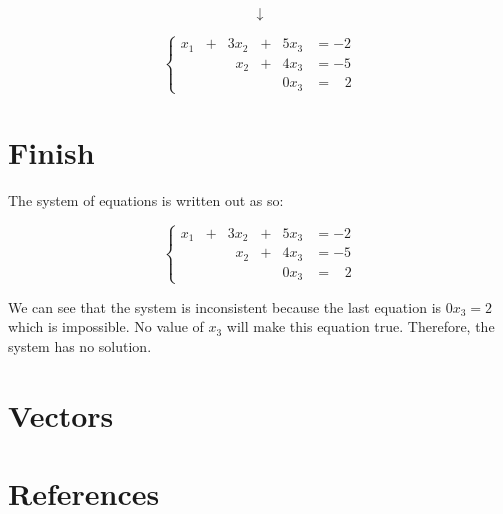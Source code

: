 \documentclass[
  letterpaper,
  DIV=11,
  numbers=noendperiod]{scrreprt}
\newlength{\cslhangindent}
\newlength{\cslentryspacingunit} %
\newenvironment{CSLReferences}[2] %
 {%
  \setlength{\parindent}{0pt}
  \ifodd #1
  \let\oldpar\par
  \def\par{\hangindent=\cslhangindent\oldpar}
  \fi
  \setlength{\parskip}{#2\cslentryspacingunit}
 }%
 {}
\begin{document}
\[  
\downarrow
\]

\[
\begin{cases}
x_1 &+ &3x_2 &+ &5x_3 &= -2 \\
& &\;\;x_2 &+ &4x_3 &= -5 \\
& & & &0x_3 &= \;\;\;2
\end{cases}
\]

\chapter{Finish}

The system of equations is written out as so:

\[
\begin{cases}
x_1 &+ &3x_2 &+ &5x_3 &= -2 \\
& &\;\;x_2 &+ &4x_3 &= -5 \\
& & & &0x_3 &= \;\;\;2
\end{cases}
\]

We can see that the system is inconsistent because the last equation is
\(0x_3 = 2\) which is impossible. No value of \(x_3\) will make this
equation true. Therefore, the system has no solution.


\hypertarget{vectors}{%
\chapter{Vectors}\label{vectors}}


\hypertarget{references}{%
\chapter*{References}\label{references}}


\hypertarget{refs}{}
\begin{CSLReferences}{0}{0}
\end{CSLReferences}
\end{document}
